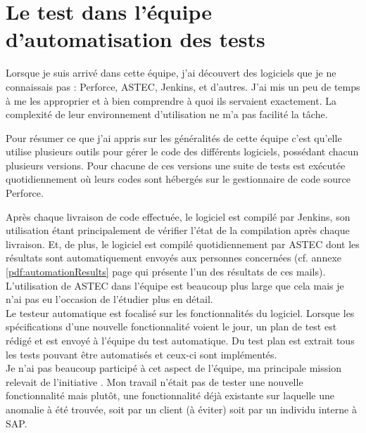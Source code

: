 \section{Le test dans l'\'{e}quipe d'automatisation des tests}
Lorsque je suis arriv\'{e} dans cette \'{e}quipe, j'ai d\'{e}couvert des logiciels que je ne connaissais pas : Perforce, ASTEC, Jenkins, et d'autres. J'ai mis un peu de temps \`{a} me les approprier et \`{a} bien comprendre \`{a} quoi ils servaient exactement. La complexit\'{e} de leur environnement d'utilisation ne m'a pas facilit\'{e} la t\^{a}che. 

Pour r\'{e}sumer ce que j'ai appris sur les g\'{e}n\'{e}ralit\'{e}s de cette \'{e}quipe c'est qu'elle utilise plusieurs outils pour g\'{e}rer le code des diff\'{e}rents logiciels, poss\'{e}dant chacun plusieurs versions. Pour chacune de ces versions une suite de tests est ex\'{e}cut\'{e}e quotidiennement o\`{u} leurs codes sont h\'{e}berg\'{e}s sur le gestionnaire de code source Perforce. 

Apr\`{e}s chaque livraison de code effectu\'{e}e, le logiciel est compil\'{e} par Jenkins, son utilisation \'{e}tant principalement de v\'{e}rifier l'\'{e}tat de la compilation apr\`{e}s chaque livraison. Et, de plus, le logiciel est compil\'{e} quotidiennement par ASTEC dont les r\'{e}sultats sont automatiquement envoy\'{e}s aux personnes concern\'{e}es (cf. annexe \ref{pdf:automationResults} page \pageref{pdf:automationResults} qui pr\'{e}sente l'un des r\'{e}sultats de ces mails). L'utilisation de ASTEC dans l'\'{e}quipe est beaucoup plus large que cela mais je n'ai pas eu l'occasion de l'\'{e}tudier plus en d\'{e}tail.\\



Le testeur automatique est focalis\'{e} sur les fonctionnalit\'{e}s du logiciel. Lorsque les sp\'{e}cifications d'une nouvelle fonctionnalit\'{e} voient le jour, un plan de test est r\'{e}dig\'{e} et est envoy\'{e} \`{a} l'\'{e}quipe du test automatique. Du test plan est extrait tous les tests pouvant \^{e}tre automatis\'{e}s et ceux-ci sont impl\'{e}ment\'{e}s.\\
Je n'ai pas beaucoup particip\'{e} \`{a} cet aspect de l'\'{e}quipe, ma principale mission relevait de l'initiative . Mon travail n'\'{e}tait pas de tester une nouvelle fonctionnalit\'{e} mais plut\^{o}t, une fonctionnalit\'{e} d\'{e}j\`{a} existante sur laquelle une anomalie \`{a} \'{e}t\'{e} trouv\'{e}e, soit par un client (\`{a} \'{e}viter) soit par un individu interne \`{a} SAP.\\

